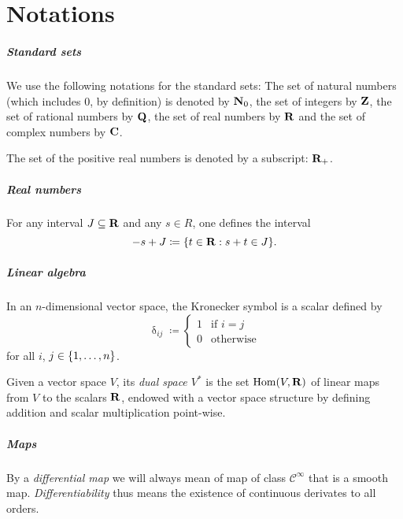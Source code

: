 \chapter*{Notations}

\paragraph{Standard sets}
We use the following notations for the standard sets: The set of natural
numbers (which includes $0$, by definition) is denoted by $\mathbf{N}_0$, the set
of integers by $\mathbf{Z}$, the set of rational numbers by $\mathbf{Q}$, the set of
real numbers by $\mathbf{R}$ and the set of complex numbers by $\mathbf{C}$.

The set of the positive real numbers is denoted by a subscript: $\mathbf{R}_+$. 

\paragraph{Real numbers}

For any interval $J \subseteq \mathbf{R}$ and any $s \in R$, one defines the interval
\[
  - s + J \coloneqq \lbrace t \in \mathbf{R} : s + t \in J\rbrace.
\]

\paragraph{Linear algebra}

In an $n$-dimensional vector space, the Kronecker symbol is a scalar defined by 
\[
  \updelta_{ij} \coloneqq \begin{cases}
    1 & \text{if $i = j$} \\
    0 & \text{otherwise}
  \end{cases}
\]
for all $i$, $j \in \lbrace1, \dotsc, n\rbrace$.

Given a vector space $V$, its \emph{dual space $V^*$} is the set $\operatorname{Hom}(V, \mathbf{R})$
of linear maps from $V$ to the scalars $\mathbf{R}$, endowed with a vector space
structure by defining addition and scalar multiplication point-wise.

\paragraph{Maps}

By a \emph{differential map} we will always mean of map of class $\mathcal C^\infty$
that is a smooth map. \emph{Differentiability} thus means the existence of
continuous derivates to all orders.

